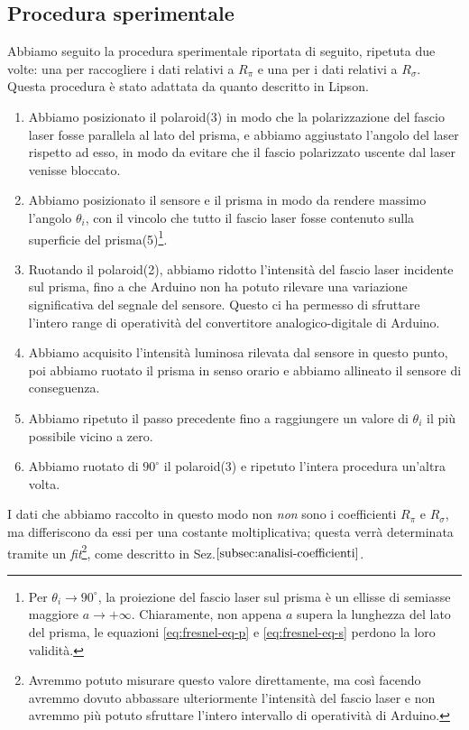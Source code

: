 \subsection{Procedura sperimentale}\label{subsec:procedura-sperimentale}
  Abbiamo seguito la procedura sperimentale riportata di seguito, ripetuta due
  volte: una per raccogliere i dati relativi a $R_\pi$ e una per i dati relativi
  a $R_\sigma$. Questa procedura è stato adattata da quanto descritto in Lipson\cite{lipson20}.
  \begin{enumerate}
    \item%
      Abbiamo posizionato il polaroid(3) in modo che la polarizzazione del
      fascio laser fosse parallela al lato del prisma, e abbiamo aggiustato l'angolo
      del laser rispetto ad esso, in modo da evitare che il fascio
      polarizzato uscente dal laser venisse bloccato.
    \item%
      Abbiamo posizionato il sensore e il prisma in modo da rendere
      massimo l'angolo $\theta_i$, con il vincolo che
      tutto il fascio laser fosse contenuto sulla superficie del prisma(5)\footnote{Per $\theta_i \to 90^\circ$, la
      proiezione del fascio laser sul prisma è un ellisse di semiasse maggiore $a \to +\infty$. Chiaramente, non appena
      $a$ supera la lunghezza del lato del prisma, le equazioni \eqref{eq:fresnel-eq-p} e \eqref{eq:fresnel-eq-s} perdono
      la loro validità.}.
    \item%
      Ruotando il polaroid(2), abbiamo ridotto l’intensità del fascio laser
      incidente sul prisma, fino a che Arduino non ha potuto rilevare una
      variazione significativa del segnale del sensore.
      Questo ci ha permesso di sfruttare l'intero range di operatività del convertitore analogico-digitale di Arduino.
    \item%
      Abbiamo acquisito l'intensità luminosa rilevata dal sensore in questo punto,
      poi abbiamo ruotato il prisma in senso orario e abbiamo
      allineato il sensore di conseguenza.
    \item%
      Abbiamo ripetuto il passo precedente fino a raggiungere un valore di $\theta_i$
      il più possibile vicino a zero.
    \item%
      Abbiamo ruotato di $90^\circ$ il polaroid(3) e ripetuto l'intera
      procedura un'altra volta.
  \end{enumerate}
  I dati che abbiamo raccolto in questo modo non \emph{non} sono
  i coefficienti $R_\pi$ e $R_\sigma$, ma differiscono da essi per una costante
  moltiplicativa; questa verrà determinata tramite un \emph{fit}\footnote{Avremmo potuto misurare
  questo valore direttamente, ma così facendo avremmo dovuto
  abbassare ulteriormente l'intensità del fascio laser e non avremmo più potuto
  sfruttare l'intero intervallo di operatività di Arduino.}, come descritto in Sez.$\ref{subsec:analisi-coefficienti}$.
\endinput

